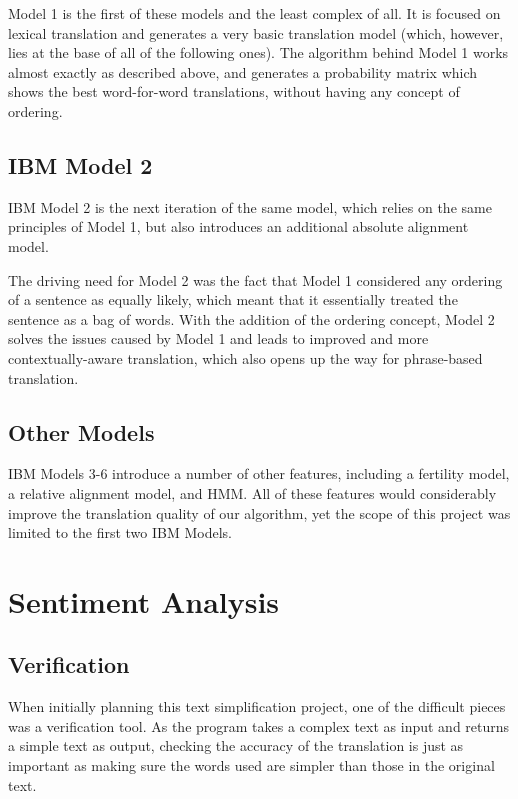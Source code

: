 \documentclass[11pt]{article}
\begin{document}
Model 1 is the first of these models and the least complex of all. It is focused on lexical translation and generates a very basic translation model (which, however, lies at the base of all of the following ones). The algorithm behind Model 1 works almost exactly as described above, and generates a probability matrix which shows the best word-for-word translations, without having any concept of ordering.

\subsection{IBM Model 2}

IBM Model 2 is the next iteration of the same model, which relies on the same principles of Model 1, but also introduces an additional absolute alignment model.

The driving need for Model 2 was the fact that Model 1 considered any ordering of a sentence as equally likely, which meant that it essentially treated the sentence as a bag of words. With the addition of the ordering concept, Model 2 solves the issues caused by Model 1 and leads to improved and more contextually-aware translation, which also opens up the way for phrase-based translation.

\subsection{Other Models}

IBM Models 3-6 introduce a number of other features, including a fertility model, a relative alignment model, and HMM. All of these features would considerably improve the translation quality of our algorithm, yet the scope of this project was limited to the first two IBM Models.

\section{Sentiment Analysis}
\subsection{Verification}
When initially planning this text simplification project, one of the difficult pieces was a verification tool. As the program takes a complex text as input and returns a simple text as output, checking the accuracy of the translation is just as important as making sure the words used are simpler than those in the original text. 
\end{document}
